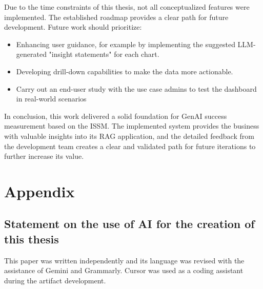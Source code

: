 \documentclass[
	english,
	ruledheaders=section,%
	class=report,%
	thesis={type=bachelor},%
	accentcolor=1b,%
	custommargins=true,%
	marginpar=false,%
	parskip=half-,%
	fontsize=11pt,%
	DIV=14,
]{tudapub}
\begin{document}
Due to the time constraints of this thesis, not all conceptualized features were implemented. The established roadmap provides a clear path for future development. Future work should prioritize:
\begin{itemize}
    \item Enhancing user guidance, for example by implementing the suggested LLM-generated "insight statements" for each chart.
    \item Developing drill-down capabilities to make the data more actionable.
    \item Carry out an end-user study with the use case admins to test the dashboard in real-world scenarios
\end{itemize}

In conclusion, this work delivered a solid foundation for GenAI success measurement based on the ISSM. The implemented system provides the business with valuable insights into its RAG application, and the detailed feedback from the development team creates a clear and validated path for future iterations to further increase its value.
\chapter*{Appendix}
\setcounter{page}{\value{seitenzahlroemisch}}
\section{Statement on the use of AI for the creation of this thesis}
This paper was written independently and its language was revised with the assistance of Gemini and Grammarly. Cursor was used as a coding assistant during the artifact development.

\printbibliography


\end{document}
